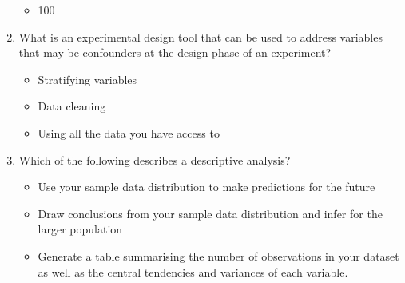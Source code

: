 \documentclass[10pt,a4paper,twoside]{article}\usepackage[]{graphicx}\usepackage[]{xcolor}
\begin{document}
\begin{enumerate}
\begin{itemize}
      \item 100
    \end{itemize}
  \item What is an experimental design tool that can be used to address variables that may be confounders at the design phase of an experiment?
    \begin{itemize}
      \item Stratifying variables
      \item Data cleaning
      \item Using all the data you have access to
    \end{itemize}
  \item Which of the following describes a descriptive analysis?
    \begin{itemize}
      \item Use your sample data distribution to make predictions for the future
      \item Draw conclusions from your sample data distribution and infer for the larger population
      \item Generate a table summarising the number of observations in your dataset as well as the central tendencies and variances of each variable.
    \end{itemize}
\end{enumerate}
\end{document}
